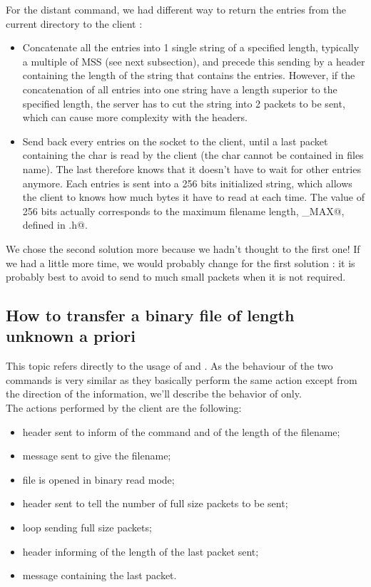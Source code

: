 \documentclass{article}
\begin{document}
For the distant \verb@LS@ command, we had different way to return the entries from the current directory to the client : 
\begin{itemize}
\item Concatenate all the entries into 1 single string of a specified length, typically a multiple of MSS (see next subsection), and precede this sending by a header containing the length of the string that contains the entries. However, if the concatenation of all entries into one string have a length superior to the specified length, the server has to cut the string into 2 packets to be sent, which can cause more complexity with the headers.
\item Send back every entries on the socket to the client, until a last packet containing the char \verb@\n@ is read by the client (the char \verb@\n@ cannot be contained in files name). The last therefore knows that it doesn't have to wait for other entries anymore. Each entries is sent into a 256 bits initialized string, which allows the client to knows how much bytes it have to read at each time. The value of 256 bits actually corresponds to the maximum filename length, \verb@NAME_MAX@, defined in \verb@limits.h@.
\end{itemize}

We chose the second solution more because we hadn't thought to the first one! If we had a little more time, we would probably change for the first solution : it is probably best to avoid to send to much small packets when it is not required.

\subsection{How to transfer a binary file of length unknown a priori}
This topic refers directly to the usage of \verb@GET@ and \verb@PUT@. As the behaviour of the two commands is very similar as they basically perform the same action except from the direction of the information, we'll describe the behavior of \verb@PUT@ only. \\

The actions performed by the client are the following:
\begin{itemize}
    \item header sent to inform of the command and of the length of the filename;
    \item message sent to give the filename;
    \item file is opened in binary read mode;
    \item header sent to tell the number of full size packets to be sent;
    \item loop sending full size packets;
    \item header informing of the length of the last packet sent;
    \item message containing the last packet.\\
\end{itemize}
\end{document}

